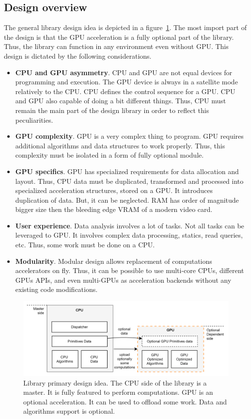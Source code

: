 \subsection{Design overview}

The general library design idea is depicted in a figure~\ref{fig:design_idea}. The most import part of the design is that the GPU acceleration is a fully optional part of the library. Thus, the library can function in any environment even without GPU. This design is dictated by the following considerations.

\begin{itemize}
    \item \textbf{CPU and GPU asymmetry}. CPU and GPU are not equal devices for programming and execution. The GPU device is always in a satellite mode relatively to the CPU. CPU defines the control sequence for a GPU. CPU and GPU also capable of doing a bit different things. Thus, CPU must remain the main part of the design library in order to reflect this peculiarities. 
    \item \textbf{GPU complexity}. GPU is a very complex thing to program. GPU requires additional algorithms and data structures to work properly. Thus, this complexity must be isolated in a form of fully optional module.
    \item \textbf{GPU specifics}. GPU has specialized requirements for data allocation and layout. Thus, CPU data must be duplicated, transformed and processed into specialized acceleration structures, stored on a GPU. It introduces duplication of data. But, it can be neglected. RAM has order of magnitude bigger size then the bleeding edge VRAM of a modern video card.
    \item \textbf{User experience}. Data analysis involves a lot of tasks. Not all tasks can be leveraged to GPU. It involves complex data processing, statics, read queries, etc. Thus, some work must be done on a CPU.
    \item \textbf{Modularity}. Modular design allows replacement of computations accelerators on fly. Thus, it can be possible to use multi-core CPUs, different GPUs APIs, and even multi-GPUs as acceleration backends without any existing code modifications.
\end{itemize}

\begin{figure}[ht]
    \centering
    \includegraphics[width=1.0\textwidth]{images/spla_design_idea.png}
    \caption{Library primary design idea. The CPU side of the library is a master. It is fully featured to perform computations. GPU is an optional acceleration. It can be used to offload some work. Data and algorithms support is optional.}
    \label{fig:design_idea}
\end{figure}


